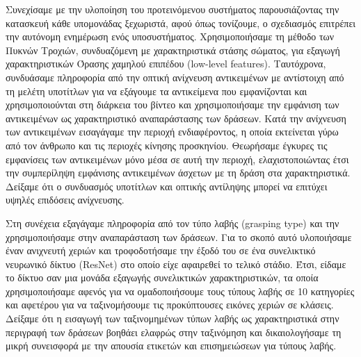 \documentclass[11pt,a4paper,english,greek,twoside]{../Thesis}
\begin{document}
\par Συνεχίσαμε με την υλοποίηση του προτεινόμενου συστήματος παρουσιάζοντας την κατασκευή κάθε υπομονάδας ξεχωριστά, αφού όπως τονίζουμε, ο σχεδιασμός επιτρέπει την αυτόνομη ενημέρωση ενός υποσυστήματος. Χρησιμοποιήσαμε τη μέθοδο των Πυκνών Τροχιών, συνδυαζόμενη με χαρακτηριστικά στάσης σώματος, για εξαγωγή χαρακτηριστικών Όρασης χαμηλού επιπέδου (low-level features). Ταυτόχρονα, συνδυάσαμε πληροφορία από την οπτική ανίχνευση αντικειμένων με αντίστοιχη από τη μελέτη υποτίτλων για να εξάγουμε τα αντικείμενα που εμφανίζονται και χρησιμοποιούνται στη διάρκεια του βίντεο και χρησιμοποιήσαμε την εμφάνιση των αντικειμένων ως χαρακτηριστικό αναπαράστασης των δράσεων. Κατά την ανίχνευση των αντικειμένων εισαγάγαμε την περιοχή ενδιαφέροντος, η οποία εκτείνεται γύρω από τον άνθρωπο και τις περιοχές κίνησης προσκηνίου. Θεωρήσαμε έγκυρες τις εμφανίσεις των αντικειμένων μόνο μέσα σε αυτή την περιοχή, ελαχιστοποιώντας έτσι την συμπερίληψη εμφάνισης αντικειμένων άσχετων με τη δράση στα χαρακτηριστικά. Δείξαμε ότι ο συνδυασμός υποτίτλων και οπτικής αντίληψης μπορεί να επιτύχει υψηλές επιδόσεις ανίχνευσης.

\par Στη συνέχεια εξαγάγαμε πληροφορία από τον τύπο λαβής (grasping type) και την χρησιμοποιήσαμε στην αναπαράσταση των δράσεων. Για το σκοπό αυτό υλοποιήσαμε έναν ανιχνευτή χεριών και τροφοδοτήσαμε την έξοδό του σε ένα συνελικτικό νευρωνικό δίκτυο (ResNet) στο οποίο είχε αφαιρεθεί το τελικό στάδιο. Έτσι, είδαμε το δίκτυο σαν μια μονάδα εξαγωγής συνελικτικών χαρακτηριστικών, τα οποία χρησιμοποιήσαμε αφενός για να ομαδοποιήσουμε τους τύπους λαβής σε 10 κατηγορίες και αφετέρου για να ταξινομήσουμε τις προκύπτουσες εικόνες χεριών σε κλάσεις. Δείξαμε ότι η εισαγωγή των ταξινομημένων τύπων λαβής ως χαρακτηριστικά στην περιγραφή των δράσεων βοηθάει ελαφρώς στην ταξινόμηση και δικαιολογήσαμε τη μικρή συνεισφορά με την απουσία ετικετών και επισημειώσεων για τύπους λαβής.
\end{document}
